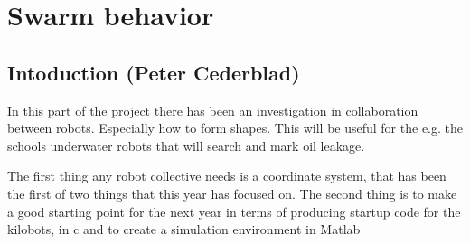 

\section{Swarm behavior}
\label{sec:Swarmbehavior}

\subsection{Intoduction (Peter Cederblad)}
In this part of the project there has been an investigation in collaboration between robots. Especially how to form shapes. This will be useful for the e.g. the schools underwater robots that will search and mark oil leakage. 

The first thing any robot collective needs is a coordinate system, that has been the first of two things that this year has focused on. The second thing is to make a good starting point for the next year in terms of producing startup code for the kilobots, in c and to create a simulation environment in Matlab




